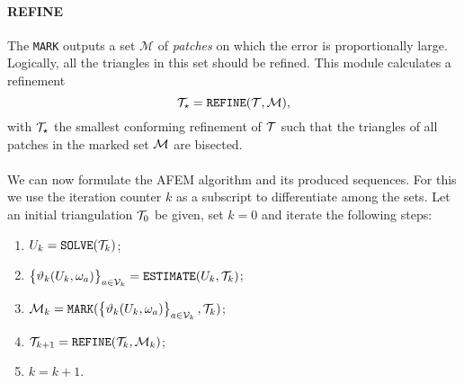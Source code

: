 \documentclass[thesis.tex]{subfiles}
\begin{document}
\paragraph{REFINE}
The \texttt{MARK} outputs a set $\mathcal{M}$ of \emph{patches} on which the error is proportionally large. 
Logically, all the triangles in this set should be refined. This module calculates a refinement
\[
  \mathcal{T}_\star = \texttt{REFINE}(\mathcal{T}, \mathcal{M}),
\]
with $\mathcal{T}_\star$ the smallest conforming refinement of $\mathcal{T}$ such that the triangles of
all patches in the marked set $\mathcal{M}$ are bisected.
\\\\
We can now formulate the AFEM algorithm and its produced sequences. For this we use the
iteration counter $k$ as a subscript to differentiate among the sets.
Let an initial triangulation $\mathcal{T}_0$ be given, set $k = 0$ and iterate the following steps:
\begin{enumerate}
\item $U_k = \texttt{SOLVE}(\mathcal{T}_k)$;
\item $\set{\vartheta_k(U_k, \omega_a)}_{a \in \mathcal{V}_k} = \texttt{ESTIMATE}(U_k, \mathcal{T}_k)$;
  \item $\mathcal{M}_k = \texttt{MARK}(\set{\vartheta_k(U_k, \omega_a)}_{a \in \mathcal{V}_k}, \mathcal{T}_k)$;
  \item $\mathcal{T}_{k+1} = \texttt{REFINE}(\mathcal{T}_k, \mathcal{M}_k)$;
  \item $k  = k + 1$.
\end{enumerate}
\end{document}
